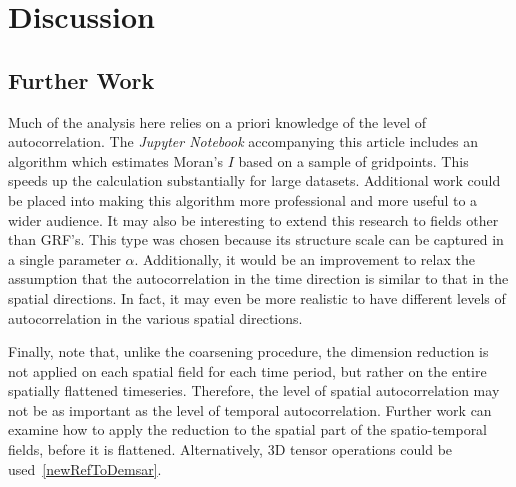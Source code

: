 \documentclass[ijgi,article,submit,moreauthors,pdftex,10pt,a4paper]{Definitions/mdpi}
\begin{document}


\section{Discussion}


\subsection{Further Work}
\label{sec:Discussion/Further Work}

Much of the analysis here relies on a priori knowledge of the level of autocorrelation. The \textit{Jupyter Notebook} accompanying this article includes an algorithm which estimates Moran's $I$ based on a sample of gridpoints. This speeds up the calculation substantially for large datasets. Additional work could be placed into making this algorithm more professional and more useful to a wider audience. It may also be interesting to extend this research to fields other than GRF's. This type was chosen because its structure scale can be captured in a single parameter $\alpha$. Additionally, it would be an improvement to relax the assumption that the autocorrelation in the time direction is similar to that in the spatial directions. In fact, it may even be more realistic to have different levels of autocorrelation in the various spatial directions.

Finally, note that, unlike the coarsening procedure, the dimension reduction is not applied on each spatial field for each time period, but rather on the entire spatially flattened timeseries. Therefore, the level of spatial autocorrelation may not be as important as the level of temporal autocorrelation. Further work can examine how to apply the reduction to the spatial part of the spatio-temporal fields, before it is flattened. Alternatively, 3D tensor operations could be used~\ref{newRefToDemsar}.
\end{document}
